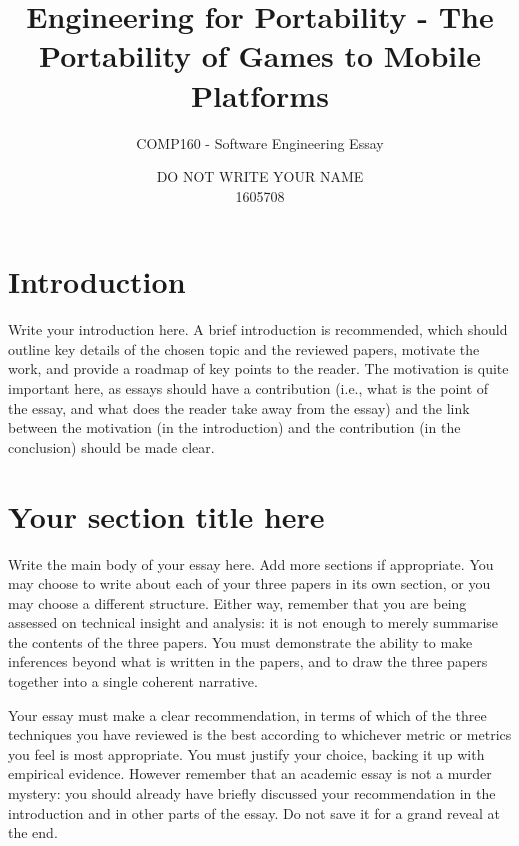 \documentclass{scrartcl}
\title{Engineering for Portability - The Portability of Games to Mobile Platforms}
\subtitle{COMP160 - Software Engineering Essay}
\author{DO NOT WRITE YOUR NAME\\ 1605708}
\begin{document}
\maketitle


\section{Introduction}

Write your introduction here. A brief introduction is recommended, which should outline key details of the chosen topic and the reviewed papers, motivate the work, and provide a roadmap of key points to the reader. The motivation is quite important here, as essays should have a contribution (i.e., what is the point of the essay, and what does the reader take away from the essay) and the link between the motivation (in the introduction) and the contribution (in the conclusion) should be made clear.

\section{Your section title here}

Write the main body of your essay here. Add more sections if appropriate. You may choose to write about each of your three papers in its own section, or you may choose a different structure. Either way, remember that you are being assessed on technical insight and analysis: it is not enough to merely summarise the contents of the three papers. You must demonstrate the ability to make inferences beyond what is written in the papers, and to draw the three papers together into a single coherent narrative.

Your essay must make a clear recommendation, in terms of which of the three techniques you have reviewed is the best according to whichever metric or metrics you feel is most appropriate. You must justify your choice, backing it up with empirical evidence. However remember that an academic essay is not a murder mystery: you should already have briefly discussed your recommendation in the introduction and in other parts of the essay. Do not save it for a grand reveal at the end.
\end{document}
